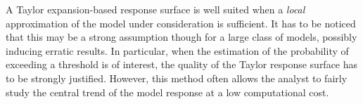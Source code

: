            {A Taylor expansion-based response surface is well suited when a \emph{local} approximation of the model under consideration is sufficient. It has to be noticed that this may be a strong assumption though for a large class of models, possibly inducing erratic results. In particular, when the estimation of the probability of exceeding a threshold is of interest, the quality of the Taylor response surface has to be strongly justified. However, this method often allows the analyst to fairly study the central trend of the model response at a low computational cost.
            }
